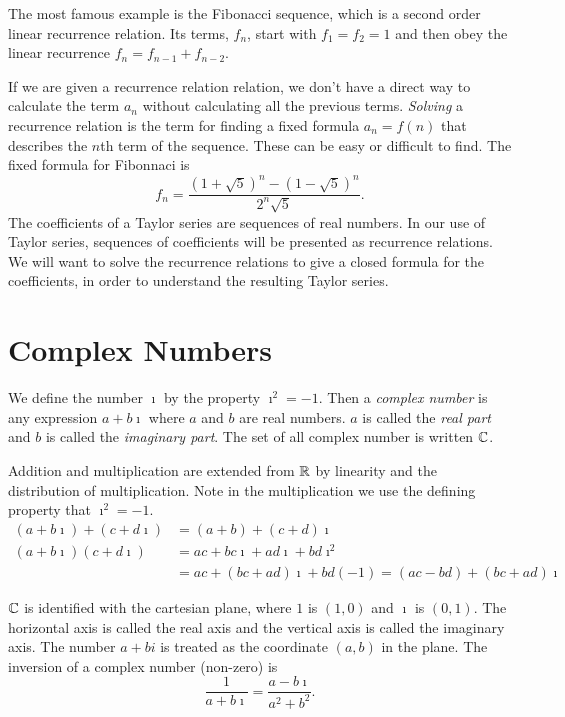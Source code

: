\documentclass[fleqn,letterpaper]{report}
\begin{document}
The most famous example is the Fibonacci sequence, which is a
second order linear recurrence relation. Its terms, $f_n$,
start with $f_1 = f_2 = 1$ and then obey the linear recurrence
$f_n = f_{n-1} + f_{n-2}$. 

If we are given a recurrence relation relation, we don't have
a direct way to calculate the term $a_n$ without calculating
all the previous terms. \emph{Solving} a recurrence relation
is the term for finding a fixed formula $a_n = f(n)$ that
describes the $n$th term of the sequence. These can be easy
or difficult to find. The fixed formula for Fibonnaci is
\begin{equation*}
f_n = \frac{(1+\sqrt{5})^n - (1-\sqrt{5})^n}{2^n \sqrt{5}}.
\end{equation*}
The coefficients of a Taylor series are sequences of real
numbers. In our use of Taylor series, sequences of
coefficients will be presented as recurrence relations. We
will want to solve the recurrence relations to give a closed
formula for the coefficients, in order to understand the
resulting Taylor series. 

\section{Complex Numbers}
\label{complex-numbers}

\begin{defn}
We define the number $\imath$ by the property $\imath^2 = -1$.
Then a \emph{complex number} is any expression $a + b \imath$
where $a$ and $b$ are real numbers. $a$ is called the
\emph{real part} and $b$ is called the \emph{imaginary part}.
The set of all complex number is written $\mathbb{C}$. 
\end{defn}

Addition and multiplication are extended from $\mathbb{R}$ by
linearity and the distribution of multiplication. Note in the
multiplication we use the defining property that $\imath^2 =
-1$. 
\begin{align*}
(a + b \imath) + (c + d \imath) & = (a+b) + (c+d) \imath \\
(a + b \imath)(c + d \imath) & = ac + bc \imath + ad \imath +
bd \imath^2 \\
& = ac + (bc + ad) \imath + bd(-1) = (ac-bd) + (bc+ad) \imath
\end{align*}

$\mathbb{C}$ is identified with the cartesian plane, where $1$ is
$(1,0)$ and $\imath$ is $(0,1)$. The horizontal axis is called
the real axis and the vertical axis is called the imaginary
axis. The number $a + bi$ is treated as the coordinate $(a,b)$
in the plane. The inversion of a complex number (non-zero)
is
\begin{equation*}
\frac{1}{a+ b \imath } = \frac{a-b\imath}{a^2+b^2}.
\end{equation*}
\end{document}
